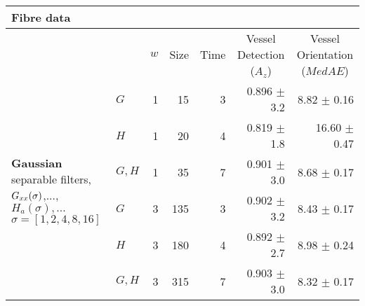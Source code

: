 \begin{tabularx}{\linewidth}{p{3.1cm} p{3cm} r r r r r}
\toprule
\multicolumn{7}{l}{Fibre data} \\
\midrule
            &
            & $w$
            & Size
            & Time
            & \multicolumn{1}{c}{Vessel Detection \linebreak ($A_z$)}
            & \multicolumn{1}{c}{Vessel Orientation \linebreak ($MedAE$)}  \\

\midrule
\multirow{6}{3.1cm}{\centering
    \textbf{Gaussian}
    \newline separable filters,
    \newline
    \newline $G_{xx}(\sigma)$,..., $H_a(\sigma),...$
    \newline  $\sigma = [1, 2, 4, 8, 16]$ }
        & $G$                       & 1 &    15 &   3   & 0.896 $\pm$ 3.2   & 8.82 $\pm$ 0.16 \\
        & $H$                       & 1 &    20 &   4   & 0.819 $\pm$ 1.8   &16.60 $\pm$ 0.47 \\
        & $G, H$                    & 1 &    35 &   7   & 0.901 $\pm$ 3.0   & 8.68 $\pm$ 0.17 \\
        & $G$                       & 3 &   135 &   3   & 0.902 $\pm$ 3.2   & 8.43 $\pm$ 0.17 \\
        & $H$                       & 3 &   180 &   4   & 0.892 $\pm$ 2.7   & 8.98 $\pm$ 0.24 \\
        & $G, H$                    & 3 &   315 &   7   & 0.903 $\pm$ 3.0   & 8.32 $\pm$ 0.17 \\


\end{tabularx}
